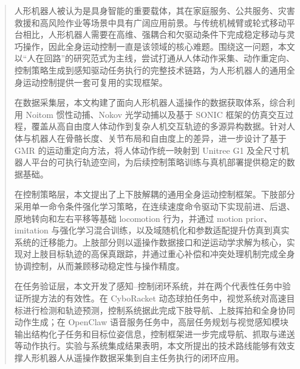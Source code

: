 

\begin{abstract}
  人形机器人被认为是具身智能的重要载体，其在家庭服务、公共服务、灾害救援和高风险作业等场景中具有广阔应用前景。与传统机械臂或轮式移动平台相比，人形机器人需要在高维、强耦合和欠驱动条件下完成稳定移动与灵巧操作，因此全身运动控制一直是该领域的核心难题。围绕这一问题，本文以“人在回路”的研究范式为主线，尝试打通从人体动作采集、动作重定向、控制策略生成到感知驱动任务执行的完整技术链路，为人形机器人的通用全身运动控制提供一套可复用的实现框架。

  在数据采集层，本文构建了面向人形机器人遥操作的数据获取体系，综合利用 Noitom 惯性动捕、Nokov 光学动捕以及基于 SONIC 框架的仿真交互过程，覆盖从高自由度人体动作到复杂人机交互轨迹的多源异构数据。针对人体与机器人在骨骼长度、关节布局和自由度上的差异，进一步设计了基于 GMR 的运动重定向方法，将人体动作统一映射到 Unitree G1 及全尺寸机器人平台的可执行轨迹空间，为后续控制策略训练与真机部署提供稳定的数据基础。

  在控制策略层，本文提出了上下肢解耦的通用全身运动控制框架。下肢部分采用单一命令条件强化学习策略，在连续速度命令驱动下实现前进、后退、原地转向和左右平移等基础 locomotion 行为，并通过 motion prior、imitation 与强化学习混合训练，以及域随机化和参数适配提升仿真到真实系统的迁移能力。上肢部分则以遥操作数据接口和逆运动学求解为核心，实现对上肢目标轨迹的高保真跟踪，并通过重心补偿和冲突处理机制完成全身协调控制，从而兼顾移动稳定性与操作精度。

  在任务验证层，本文开发了感知--控制闭环系统，并在两个代表性任务中验证所提方法的有效性。在 CyboRacket 动态球拍任务中，视觉系统对高速目标进行检测和轨迹预测，控制系统据此完成下肢导航、上肢挥拍和全身协同动作生成；在 OpenClaw 语音服务任务中，高层任务规划与视觉感知模块输出结构化子任务和目标位姿信息，控制框架进一步完成导航、抓取与递送等动作执行。实验与系统集成结果表明，本文所提出的技术路线能够有效支撑人形机器人从遥操作数据采集到自主任务执行的闭环应用。
\end{abstract}


